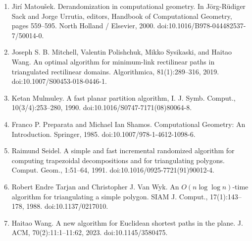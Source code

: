 \begin{enumerate}
\item[]  [23]  Jirí Matoušek.  Derandomization in computational geometry.  In Jörg-Rüdiger Sack and Jorge Urrutia, editors, Handbook of Computational Geometry, pages 559–595. North Holland / Elsevier, 2000.  doi:10.1016/B978-044482537-7/50014-0.  
\item[]  [24]  Joseph S. B. Mitchell, Valentin Polishchuk, Mikko Sysikaski, and Haitao Wang.  An optimal algorithm for minimum-link rectilinear paths in triangulated rectilinear domains.  Algorithmica, 81(1):289–316, 2019.  doi:10.1007/S00453-018-0446-1.  
\item[]  [25]  Ketan Mulmuley.  A fast planar partition algorithm, I.  J. Symb. Comput., 10(3/4):253–280, 1990.  doi:10.1016/S0747-7171(08)80064-8.  
\item[]  [26]  Franco P. Preparata and Michael Ian Shamos.  Computational Geometry: An Introduction.  Springer, 1985.  doi:10.1007/978-1-4612-1098-6.  
\item[]  [27]  Raimund Seidel.  A simple and fast incremental randomized algorithm for computing trapezoidal decompositions and for triangulating polygons.  Comput. Geom., 1:51–64, 1991.  doi:10.1016/0925-7721(91)90012-4.  
\item[]  [28]  Robert Endre Tarjan and Christopher J. Van Wyk.  An $O(n\log\log n)$-time algorithm for triangulating a simple polygon.  SIAM J. Comput., 17(1):143–178, 1988.  doi:10.1137/0217010.  
\item[]  [29]  Haitao Wang.  A new algorithm for Euclidean shortest paths in the plane.  J. ACM, 70(2):11:1–11:62, 2023.  doi:10.1145/3580475.  
\end{enumerate}
